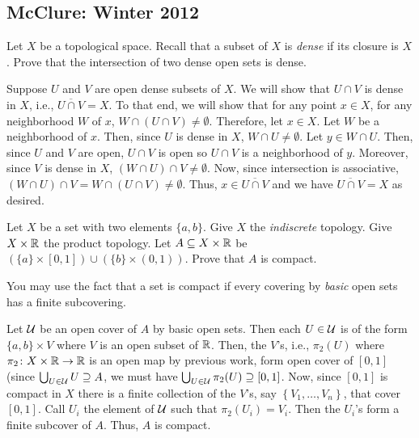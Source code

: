 \subsection{McClure: Winter 2012}
\setcounter{exercise}{0}

\begin{problem}
  Let \(X\) be a topological space. Recall that a subset of \(X\) is
  \emph{dense} if its closure is \(X\). Prove that the intersection of two
  dense open sets is dense.
\end{problem}
\begin{solution}
  Suppose \(U\) and \(V\) are open dense subsets of \(X\). We will show
  that \(U\cap V\) is dense in \(X\), i.e., \(\overline{U\cap V}=X\). To
  that end, we will show that for any point \(x\in X\), for any
  neighborhood \(W\) of \(x\), \(W\cap(U\cap V)\neq\emptyset\). Therefore,
  let \(x\in X\). Let \(W\) be a neighborhood of \(x\). Then, since \(U\)
  is dense in \(X\), \(W\cap U\neq\emptyset\). Let \(y\in W\cap U\). Then,
  since \(U\) and \(V\) are open, \(U\cap V\) is open so \(U\cap V\) is a
  neighborhood of \(y\). Moreover, since \(V\) is dense in \(X\),
  \((W\cap U)\cap V\neq\emptyset\). Now, since intersection is associative,
  \((W\cap U)\cap V=W\cap(U\cap V)\neq\emptyset\). Thus,
  \(x\in\overline{U\cap V}\) and we have \(\overline{U\cap V}=X\) as
  desired.
\end{solution}

\begin{problem}
  Let \(X\) be a set with two elements \(\{a,b\}\). Give \(X\) the
  \emph{indiscrete} topology. Give \(X\times\mathbb{R}\) the product
  topology. Let \(A\subseteq X\times\mathbb{R}\) be
  \((\{a\}\times[0,1])\cup(\{b\}\times(0,1))\). Prove that \(A\) is
  compact.

  You may use the fact that a set is compact if every covering by
  \emph{basic} open sets has a finite subcovering.
\end{problem}
\begin{solution}
  Let \(\mathcal{U}\) be an open cover of \(A\) by basic open sets. Then each
  \(U\in\mathcal{U}\) is of the form \(\{a,b\}\times V\) where \(V\) is an open
  subset of \(\mathbb{R}\). Then, the \(V\)'s, i.e., \(\pi_2(U)\) where
  \(\pi_2\colon X\times\mathbb{R}\to\mathbb{R}\) is an open map by previous work, form
  open cover of \([0,1]\) (since \(\bigcup_{U\in\mathcal{U}} U\supseteq A\), we
  must have \(\bigcup_{U\in\mathcal{U}}\pi_2(U)\supseteq[0,1]\). Now, since
  \([0,1]\) is compact in \(X\) there is a finite collection of the
  \(V\)'s, say \(\left\{V_1,\dotsc,V_n\right\}\), that cover
  \([0,1]\). Call \(U_i\) the element of \(\mathcal{U}\) such that
  \(\pi_2(U_i)=V_i\). Then the \(U_i\)'s form a finite subcover of
  \(A\). Thus, \(A\) is compact.
\end{solution}

